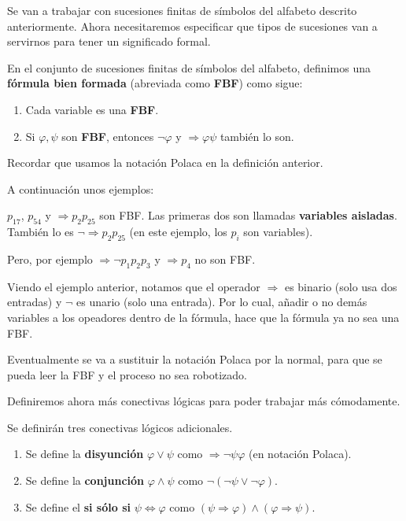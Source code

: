 \documentclass[12pt]{report}
\theoremstyle{largebreak}
\begin{document}
    Se van a trabajar con sucesiones finitas de símbolos del alfabeto descrito anteriormente. Ahora necesitaremos especificar que tipos de sucesiones van a servirnos para tener un significado formal.

    \begin{mydef}
        En el conjunto de sucesiones finitas de símbolos del alfabeto, definimos una \textbf{fórmula bien formada} (abreviada como \textbf{FBF}) como sigue:
        \begin{enumerate}
            \item Cada variable es una \textbf{FBF}.
            \item Si $\varphi,\psi$ son \textbf{FBF}, entonces $\neg\varphi$ y $\Rightarrow\varphi\psi$ también lo son.
        \end{enumerate}
    \end{mydef}

    \begin{obs}
        Recordar que usamos la notación Polaca en la definición anterior.
    \end{obs}

    A continuación unos ejemplos:
    
    \begin{exa}
        $p_{17}$, $p_{54}$ y $\Rightarrow p_2p_{25}$ son FBF. Las primeras dos son llamadas \textbf{variables aisladas}. También lo es $\neg \Rightarrow p_2p_{25}$ (en este ejemplo, los $p_i$ son variables).

        Pero, por ejemplo $\Rightarrow \neg p_1 p_2 p_3$ y $\Rightarrow p_4$ no son FBF.
    \end{exa}

    Viendo el ejemplo anterior, notamos que el operador $\Rightarrow$ es binario (solo usa dos entradas) y $\neg$ es unario (solo una entrada). Por lo cual, añadir o no demás variables a los opeadores dentro de la fórmula, hace que la fórmula ya no sea una FBF.

    \begin{obs}
        Eventualmente se va a sustituir la notación Polaca por la normal, para que se pueda leer la FBF y el proceso no sea robotizado.
    \end{obs}

    Definiremos ahora más conectivas lógicas para poder trabajar más cómodamente.

    \begin{mydef}
        Se definirán tres conectivas lógicos adicionales.
        \begin{enumerate}
            \item Se define la \textbf{disyunción} $\varphi\lor\psi$ como $\Rightarrow\neg\psi\varphi$ (en notación Polaca).
            \item Se define la \textbf{conjunción} $\varphi\land\psi$ como $\neg(\neg\psi\lor\neg\varphi)$.
            \item Se define el \textbf{si sólo si} $\psi\iff\varphi$ como $(\psi\Rightarrow\varphi)\land(\varphi\Rightarrow\psi)$.
        \end{enumerate}
    \end{mydef}
\end{document}
